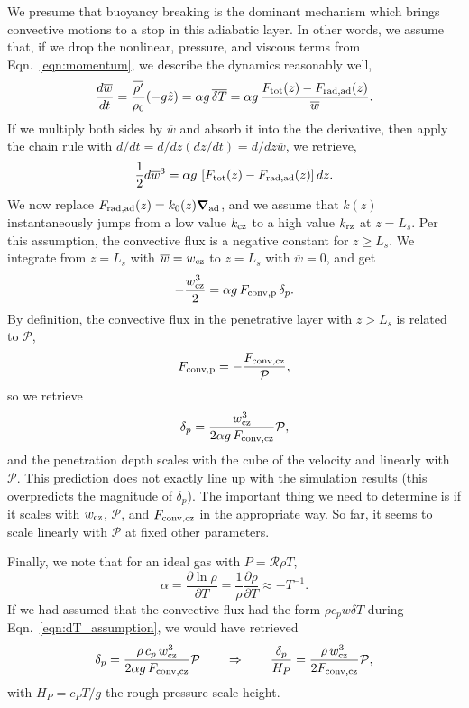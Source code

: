 \documentclass[12pt]{article}
\renewcommand{\vec}[1]{\boldsymbol{#1}}
\newcommand{\grad}{\vec{\nabla}}
\begin{document}
We presume that buoyancy breaking is the dominant mechanism which brings convective motions to a stop in this adiabatic layer.
In other words, we assume that, if we drop the nonlinear, pressure, and viscous terms from Eqn.~\ref{eqn:momentum}, we describe the dynamics reasonably well,
\begin{equation}
\frac{d \overline{w}}{dt} = \frac{\overline{\rho'}}{\rho_0}(-g\hat{z}) = \alpha g\, \overline{\delta T} = \alpha g \, \frac{F_{\rm{tot}}(z) - F_{\rm{rad, ad}}(z)}{\overline{w}}.
\end{equation}
If we multiply both sides by $\overline{w}$ and absorb it into the the derivative, then apply the chain rule with $d/dt = d/dz (dz/dt) = d/dz \overline{w}$, we retrieve,
\begin{equation}
\frac{1}{2} d\overline{w}^3 = \alpha g\, \left[F_{\rm{tot}}(z) - F_{\rm{rad, ad}}(z)\right]dz.
\end{equation}
We now replace $F_{\rm{rad, ad}}(z) = k_0(z) \grad_{\rm{ad}}$, and we assume that $k(z)$ instantaneously jumps from a low value $k_{\rm{cz}}$ to a high value $k_{\rm{rz}}$ at $z = L_s$.
Per this assumption, the convective flux is a negative constant for $z \geq L_s$.
We integrate from $z = L_s$ with $\overline{w} = w_{\rm{cz}}$ to $z = L_{s}$ with $\overline{w} = 0$, and get
\begin{equation}
-\frac{w_{\rm{cz}}^3}{2} = \alpha g\, F_{\rm{conv,p}}\,  \delta_p.
\end{equation}
By definition, the convective flux in the penetrative layer with $z > L_s$ is related to $\mathcal{P}$,
\begin{equation}
F_{\rm{conv,p}} = -\frac{F_{\rm{conv,cz}}}{\mathcal{P}},
\end{equation}
so we retrieve
\begin{equation}
\delta_p = \frac{w_{\rm{cz}}^3}{2\alpha g\, F_{\rm{conv, cz}}}  \mathcal{P},
\end{equation}
and the penetration depth scales with the cube of the velocity and linearly with $\mathcal{P}$.
This prediction does not exactly line up with the simulation results (this overpredicts the magnitude of $\delta_p$).
The important thing we need to determine is if it scales with $w_{\rm{cz}}$, $\mathcal{P}$, and $F_{\rm{conv,cz}}$ in the appropriate way.
So far, it seems to scale linearly with $\mathcal{P}$ at fixed other parameters.

Finally, we note that for an ideal gas with $P = \mathcal{R} \rho T$,
\begin{equation}
\alpha = \frac{\partial \ln\rho}{\partial T} = \frac{1}{\rho}\frac{\partial\rho}{\partial T} \approx - T^{-1}.
\end{equation}
If we had assumed that the convective flux had the form $\rho c_p w \delta T$ during Eqn.~\ref{eqn:dT_assumption}, we would have retrieved
\begin{equation}
\delta_p = \frac{\rho\, c_p\, w_{\rm{cz}}^3}{2\alpha g\, F_{\rm{conv, cz}}}  \mathcal{P}
\qquad \Rightarrow \qquad
\frac{\delta_p}{H_P} = \frac{\rho\, w_{\rm{cz}}^3}{2 F_{\rm{conv, cz}}}  \mathcal{P},
\end{equation}
with $H_P = c_P T / g$ the rough pressure scale height.
\end{document}
